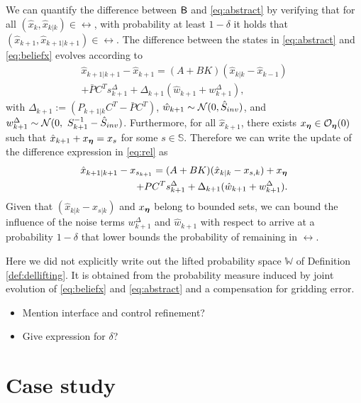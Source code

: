 \documentclass{ifacconf}
\begin{document}
We can quantify the difference between $\mathsf{B}$ and \eqref{eq:abstract} by verifying that for all  $(\hat x_k,\hat x_{k|k})\in \rel$, with probability at least $1-\delta$ it holds that $(\hat x_{k+1},\hat x_{k+1|k+1})\in \rel$. The difference between the states in \eqref{eq:abstract} and \eqref{eq:beliefx} evolves according to 
\begin{equation}
\begin{aligned}
  \hat x_{k+1|k+1}-  \hat x_{k+1}=(A+BK)(\hat x_{k|k}-\hat x_{k-1}) \\
  +  \bar P   C^T s^\Delta_{k+1} +\Delta_{k+1}( \hat{w}_{k+1}+ w^\Delta_{k+1}),
\end{aligned}
\end{equation}
with $\Delta_{k+1}:=(P_{k+1|k}C^T-  \bar P C^T)$, $ \hat{w}_{k+1}\sim \mathcal{N} (0,\hat{S}_{inv})$, and $ w^\Delta_{k+1}\sim  \mathcal{N} (0,\  S_{k+1}^{-1}-\hat{S}_{inv})$. 
Furthermore, for all $\hat x_{k+1}$, there exists $x_{\boldsymbol{\eta}} \in \mathcal{O}_{\boldsymbol{\eta}} (0)$ such that  $\hat x_{k+1}+x_{\boldsymbol{\eta}} = x_s$ for some $s \in \mathbb{S}$. Therefore we can write the update of the difference expression in \eqref{eq:rel} as  
\begin{equation}
\begin{aligned}
 \hat x_{k+1|k+1} - x_{s_{k+1}}=(A+BK)(\hat x_{k|k}- x_{s,k})+x_{\boldsymbol{\eta}} \\ + \relax P   C^T s^\Delta_{k+1} +\Delta_{k+1}( \hat{w}_{k+1}+ w^\Delta_{k+1}).
\end{aligned}
\end{equation}
Given that $(\hat x_{k|k}-\hat x_{s|k})$ and $x_{\boldsymbol{\eta}}$ belong to bounded sets, we can bound the influence of the noise terms $w^\Delta_{k+1}$ and $ \hat{w}_{k+1}$ with respect to arrive at a probability $1-\delta$ that lower bounds the probability of remaining in $\rel$.
\begin{remark}
  Here we did not explicitly write out the lifted probability space $\mathbb{W}$ of Definition \ref{def:dellifting}. It is obtained from the probability measure induced by joint evolution of \eqref{eq:beliefx} and \eqref{eq:abstract} and a compensation for gridding error. 
\end{remark}

{\color{red}
\begin{itemize}
  \item Mention interface and control refinement?
  \item Give expression for $\delta$?
\end{itemize}
}
    
\section{Case study}
\label{sec:case}
\end{document}
